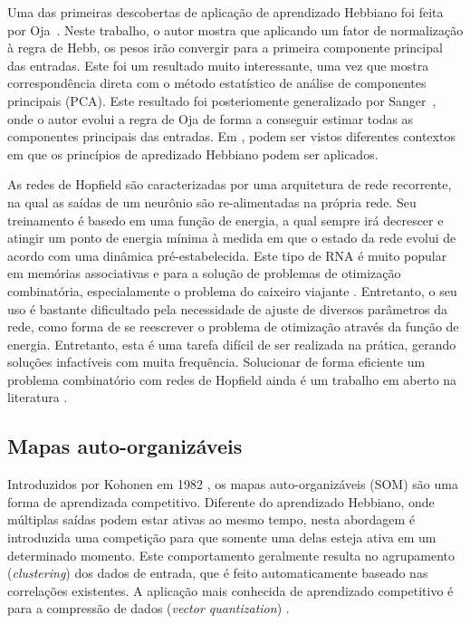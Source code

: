 \documentclass[conference]{IEEEtran}
\begin{document}
	Uma das primeiras descobertas de aplicação de aprendizado Hebbiano foi feita por Oja~\cite{oja1982simplified}. Neste trabalho, o autor mostra que aplicando um fator de normalização à regra de Hebb, os pesos irão convergir para a primeira componente principal das entradas. Este foi um resultado muito interessante, uma vez que mostra correspondência direta com o método estatístico de análise de componentes principais (PCA). Este resultado foi posteriomente generalizado por Sanger~\cite{sanger1989optimal}, onde o autor evolui a regra de Oja de forma a conseguir estimar todas as componentes principais das entradas. Em \cite{linsker1988self}, podem ser vistos diferentes contextos em que os princípios de apredizado Hebbiano podem ser aplicados.
	
	As redes de Hopfield \cite{hopfield1982neural} são caracterizadas por uma arquitetura de rede recorrente, na qual as saídas de um neurônio são re-alimentadas na própria rede. Seu treinamento é basedo em uma função de energia, a qual sempre irá decrescer e atingir um ponto de energia mínima à medida em que o estado da rede evolui de acordo com uma dinâmica pré-estabelecida. Este tipo de RNA é muito popular em memórias associativas e para a solução de problemas de otimização combinatória, especialamente o problema do caixeiro viajante \cite{hopfield1985neural,smith1999neural}. Entretanto, o seu uso é bastante dificultado pela necessidade de ajuste de diversos parâmetros da rede, como forma de se reescrever o problema de otimização através da função de energia. Entretanto, esta é uma tarefa difícil de ser realizada na prática, gerando soluções infactíveis com muita frequência. Solucionar de forma eficiente um problema combinatório com redes de Hopfield ainda é um trabalho em aberto na literatura \cite{zhang2014comprehensive}.
	
	\subsection{Mapas auto-organizáveis}
	
	Introduzidos por Kohonen em 1982 \cite{kohonen1982self}, os mapas auto-organizáveis (SOM) são uma forma de aprendizada competitivo. Diferente do aprendizado Hebbiano, onde múltiplas saídas podem estar ativas ao mesmo tempo, nesta abordagem é introduzida uma competição para que somente uma delas esteja ativa em um determinado momento. Este comportamento geralmente resulta no agrupamento (\textit{clustering}) dos dados de entrada, que é feito automaticamente baseado nas correlações existentes. A aplicação mais conhecida de aprendizado competitivo é para a compressão de dados (\textit{vector quantization}) \cite{ahalt1990competitive}.
	
\end{document}
